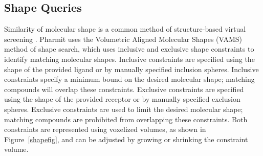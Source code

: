 \subsection{Shape Queries}

Similarity of molecular shape is a common method of structure-based virtual screening \cite{Nicholls_2010}.  Pharmit uses the Volumetric Aligned Molecular Shapes (VAMS) \cite{vams} method of shape search, which uses inclusive and exclusive shape constraints to identify matching molecular shapes.  Inclusive constraints are specified using the shape of the provided ligand or by manually specified inclusion spheres. Inclusive constraints specify a minimum bound on the desired molecular shape; matching compounds will overlap these constraints. Exclusive constraints are specified using the shape of the provided receptor or by manually specified exclusion spheres.  Exclusive constraints are used to limit the desired molecular shape; matching compounds are prohibited from overlapping these constraints.  Both constraints are represented using voxelized volumes, as shown in Figure~\ref{shapefig}, and can be adjusted by growing or shrinking the constraint volume.

